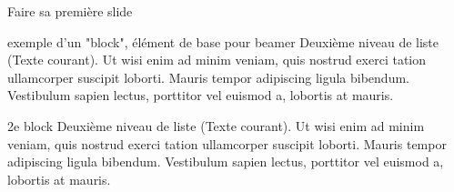 \begin{frame}{Faire sa première slide}
    \begin{block}{exemple d'un "block", élément de base pour beamer}
       Deuxième niveau de liste (Texte courant). Ut wisi enim ad minim veniam, quis nostrud exerci tation
       ullamcorper suscipit loborti. Mauris tempor adipiscing ligula bibendum. Vestibulum sapien lectus,
       porttitor vel euismod a, lobortis at mauris.
   \end{block}

   \begin{block}{2e block}
    Deuxième niveau de liste (Texte courant). Ut wisi enim ad minim veniam, quis nostrud exerci tation
    ullamcorper suscipit loborti. Mauris tempor adipiscing ligula bibendum. Vestibulum sapien lectus,
    porttitor vel euismod a, lobortis at mauris.
\end{block}
\end{frame}

